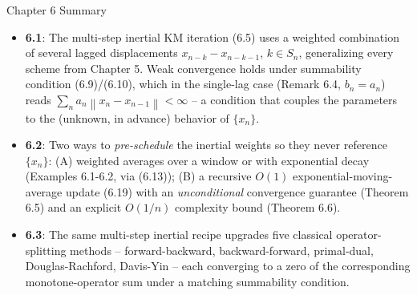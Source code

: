 \documentclass[aspectratio=169,10pt]{beamer}
\newcommand{\norm}[1]{\left\|#1\right\|}
\begin{document}
\begin{frame}{Chapter 6 Summary}
\begin{itemize}
\item \textbf{6.1}: The multi-step inertial KM iteration (6.5) uses a
weighted combination of several lagged displacements
$x_{n-k}-x_{n-k-1}$, $k\in S_n$, generalizing every scheme from Chapter 5.
Weak convergence holds under summability condition (6.9)/(6.10), which in
the single-lag case (Remark 6.4, $b_n=a_n$) reads
$\sum_n a_n\norm{x_n-x_{n-1}}<\infty$ -- a condition that couples the
parameters to the (unknown, in advance) behavior of $\{x_n\}$.
\item \textbf{6.2}: Two ways to \emph{pre-schedule} the inertial weights so
they never reference $\{x_n\}$: (A) weighted averages over a window or with
exponential decay (Examples 6.1-6.2, via (6.13)); (B) a recursive $O(1)$
exponential-moving-average update (6.19) with an \emph{unconditional}
convergence guarantee (Theorem 6.5) and an explicit $O(1/n)$ complexity
bound (Theorem 6.6).
\item \textbf{6.3}: The same multi-step inertial recipe upgrades five
classical operator-splitting methods -- forward-backward, backward-forward,
primal-dual, Douglas-Rachford, Davis-Yin -- each converging to a zero of
the corresponding monotone-operator sum under a matching summability
condition.
\end{itemize}
\end{frame}
\end{document}
